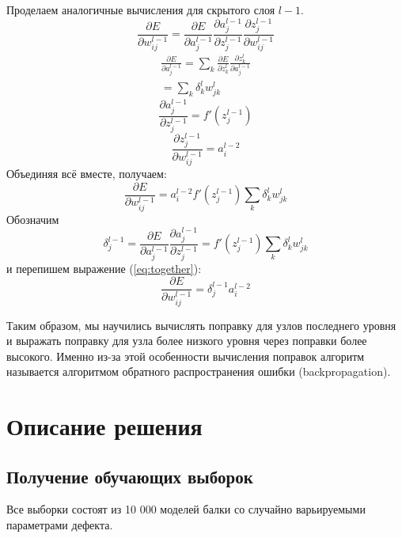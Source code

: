 \documentclass[a4paper,12pt]{article}
\theoremstyle{remark}
\begin{document}
	Проделаем аналогичные вычисления для скрытого слоя $l - 1$.
	\begin{equation}
		\frac{\partial E}{\partial w_{ij}^{l-1}} = \frac{\partial E}{\partial a_j^{l-1}} \frac{\partial a_j^{l-1}}{\partial z_j^{l-1}} \frac{\partial z_j^{l-1}}{\partial w_{ij}^{l-1}}
	\end{equation}
	\begin{equation}
		\begin{gathered}
			\frac{\partial E}{\partial a_j^{l-1}} = \sum_k \frac{\partial E}{\partial z_k^l} \frac{\partial z_k^l}{\partial a_j^{l-1}} \\
			= \sum_k \delta_k^l w_{jk}^l
		\end{gathered}
	\end{equation}
	\begin{equation}
		\frac{\partial a_j^{l-1}}{\partial z_j^{l-1}} = f'(z_j^{l-1})
	\end{equation}
	\begin{equation}
		\frac{\partial z_j^{l-1}}{\partial w_{ij}^{l-1}} = a_i^{l-2}
	\end{equation}
	Объединяя всё вместе, получаем:
	\begin{equation}\label{eq:together}
		\frac{\partial E}{\partial w_{ij}^{l-1}} = a_i^{l-2} f'(z_j^{l-1}) \sum_k \delta_k^l w_{jk}^l
	\end{equation}
	Обозначим
	\begin{equation}
		\delta_j^{l-1} = \frac{\partial E}{\partial a_j^{l-1}} \frac{\partial a_j^{l-1}}{\partial z_j^{l-1}} = f'(z_j^{l-1}) \sum_k \delta_k^l w_{jk}^l
	\end{equation}
	и перепишем выражение (\ref{eq:together}):
	\begin{equation}
		\frac{\partial E}{\partial w_{ij}^{l-1}} = \delta_j^{l-1} a_i^{l-2}
	\end{equation}
	
	Таким образом, мы научились вычислять поправку для узлов последнего уровня и выражать поправку для узла более низкого уровня через поправки более высокого. Именно из-за этой особенности вычисления поправок алгоритм называется алгоритмом обратного распространения ошибки (backpropagation).
	
	\newpage
	\section{Описание решения}
	\label{sec:solving_problem}
	
	\subsection{Получение обучающих выборок}
	Все выборки состоят из 10 000 моделей балки со случайно варьируемыми параметрами дефекта.
	
\end{document}
